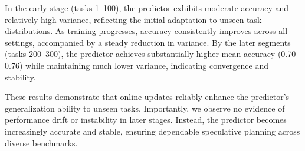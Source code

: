 In the early stage (tasks 1–100), the predictor exhibits moderate accuracy and relatively high variance, reflecting the initial adaptation to unseen task distributions. As training progresses, accuracy consistently improves across all settings, accompanied by a steady reduction in variance. By the later segments (tasks 200–300), the predictor achieves substantially higher mean accuracy (0.70–0.76) while maintaining much lower variance, indicating convergence and stability.

These results demonstrate that online updates reliably enhance the predictor’s generalization ability to unseen tasks. Importantly, we observe no evidence of performance drift or instability in later stages. Instead, the predictor becomes increasingly accurate and stable, ensuring dependable speculative planning across diverse benchmarks.

\begin{table}[t]
\centering
\caption{Predictor Accuracy per 50-Task Segment on the OpenAGI benchmark (Mean $\pm$ SD)}
\label{tab:predictor_accuracy}
\end{table}


